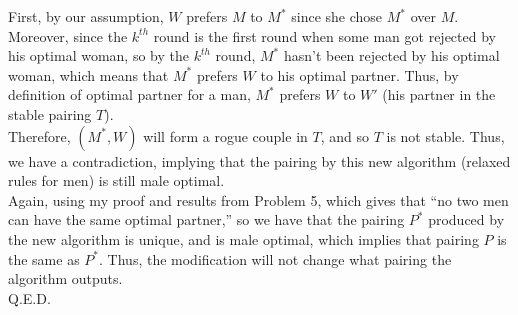 \documentclass{article}
\begin{document}
\indent First, by our assumption, $W$ prefers $M$ to $M^*$ since she chose $M^*$ over $M$. Moreover, since the $k^{th}$ round is the first round when some man got rejected by his optimal woman, so by the $k^{th}$ round, $M^*$ hasn't been rejected by his optimal woman, which means that $M^*$ prefers $W$ to his optimal partner. Thus, by definition of optimal partner for a man, $M^*$ prefers $W$ to $W'$ (his partner in the stable pairing $T$).\\[.3cm]
\indent Therefore, $(M^*, W)$ will form a rogue couple in $T$, and so $T$ is not stable. Thus, we have a contradiction, implying that the pairing by this new algorithm (relaxed rules for men) is still male optimal.\\[.3cm]
\indent Again, using my proof and results from Problem 5, which gives that ``no two men can have the same optimal partner,'' so we have that the pairing $P^*$ produced by the new algorithm is unique, and is male optimal, which implies that pairing $P$ is the same as $P^*.$ Thus, the modification will not change what pairing the algorithm outputs.\\[.5cm]
Q.E.D.
\end{document}
